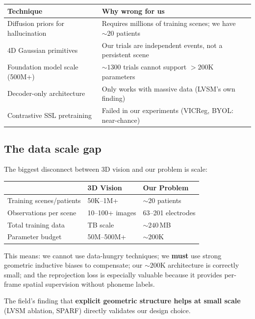 \documentclass[11pt,letterpaper]{article}
\begin{document}
\begin{table}[h]\centering\small
\begin{tabular}{@{}p{}p{}@{}}
\toprule
\textbf{Technique} & \textbf{Why wrong for us} \\
\midrule
Diffusion priors for hallucination & Requires millions of training scenes; we have ${\sim}20$ patients \\
4D Gaussian primitives & Our trials are independent events, not a persistent scene \\
Foundation model scale (500M+) & ${\sim}1300$ trials cannot support ${>}200$K parameters \\
Decoder-only architecture & Only works with massive data (LVSM's own finding) \\
Contrastive SSL pretraining & Failed in our experiments (VICReg, BYOL: near-chance) \\
\bottomrule
\end{tabular}
\end{table}

\subsection{The data scale gap}

The biggest disconnect between 3D vision and our problem is scale:

\begin{table}[h]\centering\small
\begin{tabular}{@{}lll@{}}
\toprule
& \textbf{3D Vision} & \textbf{Our Problem} \\
\midrule
Training scenes/patients & 50K--1M+ & ${\sim}20$ patients \\
Observations per scene & 10--100+ images & 63--201 electrodes \\
Total training data & TB scale & ${\sim}240$\,MB \\
Parameter budget & 50M--500M+ & ${\sim}200$K \\
\bottomrule
\end{tabular}
\end{table}

This means: we cannot use data-hungry techniques; we \textbf{must} use strong geometric inductive biases to compensate; our ${\sim}200$K architecture is correctly small; and the reprojection loss is especially valuable because it provides per-frame spatial supervision without phoneme labels.

The field's finding that \textbf{explicit geometric structure helps at small scale} (LVSM ablation, SPARF) directly validates our design choice.
\end{document}
